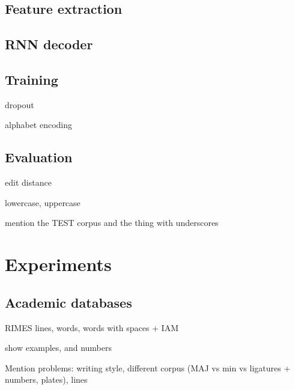 	\subsection{Feature extraction}


	\subsection{RNN decoder}


	\subsection{Training}
		dropout

		alphabet encoding



	\subsection{Evaluation}
		edit distance

		lowercase, uppercase

		mention the TEST corpus and the thing with underscores


\section{Experiments}\label{sec:transcription_experiments}


	\subsection{Academic databases}
		RIMES lines, words, words with spaces + IAM

		show examples, and numbers

		Mention problems: writing style, different corpus (MAJ vs min vs ligatures + numbers, plates), lines


